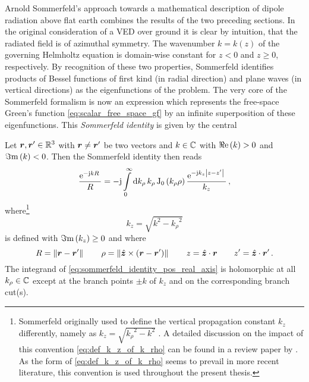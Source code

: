 Arnold Sommerfeld's approach towards a mathematical description of dipole
radiation above flat earth combines the results of the two preceding
sections.
In the original consideration of a \ac{VED} over ground \cite{Sommerfeld1909}
it is clear by intuition, that the radiated field is of azimuthal symmetry.
The wavenumber $k = k\left(z\right)$ of the governing Helmholtz equation is
domain-wise constant for $z < 0$ and $z \geq 0$, respectively.
By recognition of these two properties, Sommerfeld identifies products of
Bessel functions of first kind (in radial direction) and plane waves
(in vertical directions) as the eigenfunctions of the problem.
The very core of the Sommerfeld formalism is now an expression which represents
the free-space Green's function \eqref{eq:scalar_free_space_gf} by an infinite
superposition of these eigenfunctions.
This \emph{Sommerfeld identity} is given by the central
\cite[eq.~(10)]{Sommerfeld1909}\cite[66]{Chew1999}
\begin{theorem}\label{thm:sommerfeld_identity}
	Let $\robs, \rsrc \in \R^3$ with $\robs \neq \rsrc$ be two vectors and
	$k \in \mathbb{C}$ with $\Re\mathrm{e}\left(k\right) > 0$ and $\Im\mathrm{m}\left(k\right) < 0$.
	Then the Sommerfeld identity then reads
	\begin{equation}\label{eq:sommerfeld_identity_pos_real_axis}
		\frac{\mathrm{e}^{-\mathrm{j} k R}\,}{R} = 
		-\mathrm{j}
		\int\limits_{0}^{\infty} \mathrm{d} k_\rho \, k_\rho
		\operatorname{J}_{0} \left(k_\rho \rho\right)
		\frac{\mathrm{e}^{-\mathrm{j} k_z \left\vert z - z^\prime\right\vert}\,}{k_z}
		\, ,
	\end{equation}
	where\footnote{
		Sommerfeld originally used to define the vertical propagation constant
		$k_z$ differently, namely as $k_z = \sqrt{{k_\rho}^2 - k^2}$
		\cite{Sommerfeld1909,Sommerfeld1964}.
		A detailed discussion on the impact of this convention \vs
		\eqref{eq:def_k_z_of_k_rho} can be found in a review paper by
		\textcite{Mosig2021}.
		As the form of \eqref{eq:def_k_z_of_k_rho} seems to prevail in
		more recent literature, this convention is used throughout the present
		thesis.
		}
	\begin{equation}\label{eq:def_k_z_of_k_rho}
		k_z = \sqrt{k^2 - {k_\rho}^2}
	\end{equation}
	is defined with $\Im\mathrm{m}\left(k_z\right) \geq 0$ and where
	\begin{equation}
		\rdiffNormSymbol = \rdiffNorm \qquad
		\rho = \norm{\uv{z} \times \left(\rdiff\right)} \qquad
		z = \uv{z} \cdot \robs \qquad
		z^\prime = \uv{z} \cdot \rsrc
		\, .
	\end{equation}
	The integrand of \eqref{eq:sommerfeld_identity_pos_real_axis} is holomorphic
	at all $k_\rho \in \mathbb{C}$ except at the branch points $\pm k$ of $k_z$ and
	on the corresponding branch cut(s).
\end{theorem}
